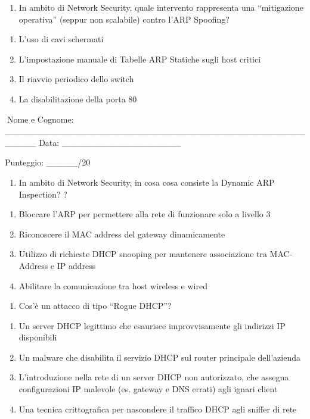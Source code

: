 \documentclass[11pt,a4paper]{article}
\providecommand{\tightlist}{%
  \setlength{\itemsep}{0pt}\setlength{\parskip}{0pt}}
\begin{document}
\begin{enumerate}
\def\labelenumi{\arabic{enumi}.}
\setcounter{enumi}{8}
\tightlist
\item
  In ambito di Network Security, quale intervento rappresenta una
  ``mitigazione operativa'' (seppur non scalabile) contro l'ARP
  Spoofing?
\end{enumerate}

\begin{enumerate}
\def\labelenumi{\Alph{enumi})}
\tightlist
\item
  L'uso di cavi schermati
\item
  L'impostazione manuale di Tabelle ARP Statiche sugli host critici
\item
  Il riavvio periodico dello switch
\item
  La disabilitazione della porta 80
\end{enumerate}

Nome e Cognome:
\_\_\_\_\_\_\_\_\_\_\_\_\_\_\_\_\_\_\_\_\_\_\_\_\_\_\_\_\_\_\_\_\_\_\_\_\_\_\_\_\_\_\_\_\_\_\_\_\_\_\_\_\_
Data: \_\_\_\_\_\_\_\_\_\_\_\_\_\_\_\_\_\_\_

Punteggio: \_\_\_\_\_/20

\begin{enumerate}
\def\labelenumi{\arabic{enumi}.}
\setcounter{enumi}{9}
\tightlist
\item
  In ambito di Network Security, in cosa cosa consiste la Dynamic ARP
  Inspection? ?
\end{enumerate}

\begin{enumerate}
\def\labelenumi{\Alph{enumi})}
\tightlist
\item
  Bloccare l'ARP per permettere alla rete di funzionare solo a livello 3
\item
  Riconoscere il MAC address del gateway dinamicamente
\item
  Utilizzo di richieste DHCP snooping per mantenere associazione tra
  MAC-Address e IP address
\item
  Abilitare la comunicazione tra host wireless e wired
\end{enumerate}

\begin{enumerate}
\def\labelenumi{\arabic{enumi}.}
\setcounter{enumi}{10}
\tightlist
\item
  Cos'è un attacco di tipo ``Rogue DHCP''?
\end{enumerate}

\begin{enumerate}
\def\labelenumi{\Alph{enumi})}
\tightlist
\item
  Un server DHCP legittimo che esaurisce improvvisamente gli indirizzi
  IP disponibili
\item
  Un malware che disabilita il servizio DHCP sul router principale
  dell'azienda
\item
  L'introduzione nella rete di un server DHCP non autorizzato, che
  assegna configurazioni IP malevole (es. gateway e DNS errati) agli
  ignari client
\item
  Una tecnica crittografica per nascondere il traffico DHCP agli sniffer
  di rete
\end{enumerate}
\end{document}
